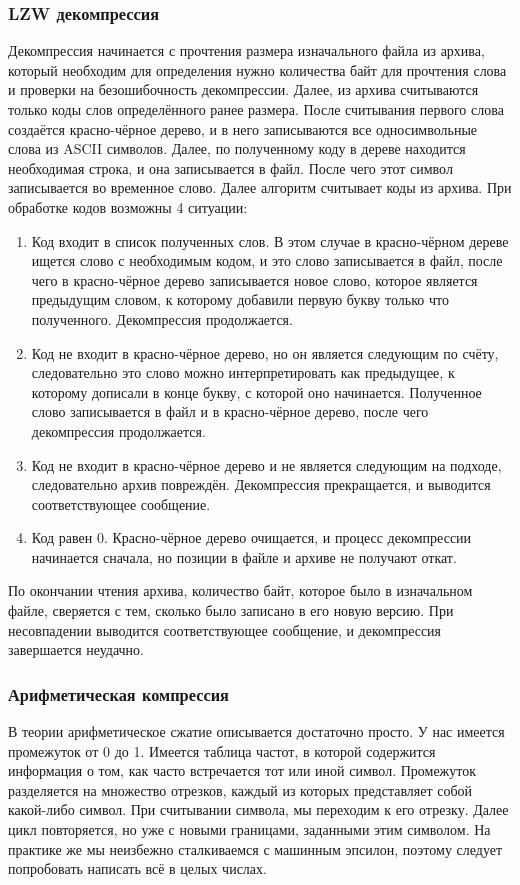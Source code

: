 \documentclass[12pt]{article}
\begin{document}
	\subsubsection*{LZW декомпрессия}
	
	Декомпрессия начинается с прочтения размера изначального файла из архива, который необходим для определения нужно количества байт для прочтения слова и проверки на безошибочность декомпрессии. Далее, из архива считываются только коды слов определённого ранее размера. После считывания первого слова создаётся красно-чёрное дерево, и в него записываются все односимвольные слова из ASCII символов. Далее, по полученному коду в дереве находится необходимая строка, и она записывается в файл. После чего этот символ записывается во временное слово. Далее алгоритм считывает коды из архива. При обработке кодов возможны 4 ситуации:
	
	\begin{enumerate}
		\item Код входит в список полученных слов. В этом случае в красно-чёрном дереве ищется слово с необходимым кодом, и это слово записывается в файл, после чего в красно-чёрное дерево записывается новое слово, которое является предыдущим словом, к которому добавили первую букву только что полученного. Декомпрессия продолжается.
		\item Код не входит в красно-чёрное дерево, но он является следующим по счёту, следовательно это слово можно интерпретировать как предыдущее, к которому дописали в конце букву, с которой оно начинается. Полученное слово записывается в файл и в красно-чёрное дерево, после чего декомпрессия продолжается.
		\item Код не входит в красно-чёрное дерево и не является следующим на подходе, следовательно архив повреждён. Декомпрессия прекращается, и выводится соответствующее сообщение.
		\item Код равен $0$. Красно-чёрное дерево очищается, и процесс декомпрессии начинается сначала, но позиции в файле и архиве не получают откат.
	\end{enumerate}
	
	По окончании чтения архива, количество байт, которое было в изначальном файле, сверяется с тем, сколько было записано в его новую версию. При несовпадении выводится соответствующее сообщение, и декомпрессия завершается неудачно.
	
	\subsubsection*{Арифметическая компрессия}
	В теории арифметическое сжатие описывается достаточно просто. У нас имеется промежуток от 0 до 1. Имеется таблица частот, в которой содержится информация о том, как часто встречается тот или иной символ. Промежуток разделяется на множество отрезков, каждый из которых представляет собой какой-либо символ. При считывании символа, мы переходим к его отрезку. Далее цикл повторяется, но уже с новыми границами, заданными этим символом. На практике же мы неизбежно сталкиваемся с машинным эпсилон, поэтому следует попробовать написать всё в целых числах.
	
\end{document}
